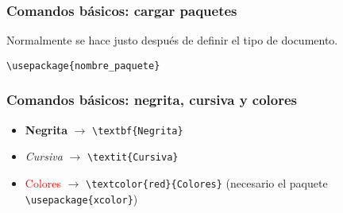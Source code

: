 
\begin{frame}[fragile]
\frametitle{Comandos básicos: cargar paquetes}
Normalmente se hace justo después de definir el tipo de documento. 

\vspace{0.5cm}

\verb|\usepackage{nombre_paquete}|
\end{frame}

\begin{frame}[fragile]
\frametitle{Comandos básicos: negrita, cursiva y colores}
\begin{itemize}
    \item \textbf{Negrita} $\rightarrow$ \verb|\textbf{Negrita}|
    \item \textit{Cursiva} $\rightarrow$ \verb|\textit{Cursiva}|
    \item \textcolor{red}{Colores} $\rightarrow$ \verb|\textcolor{red}{Colores}| (necesario el paquete \verb|\usepackage{xcolor}|)
\end{itemize}

\end{frame}

